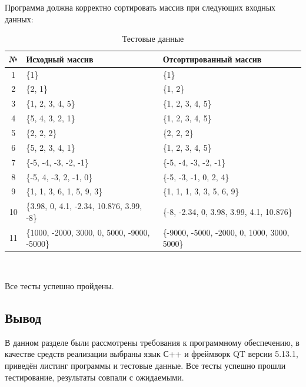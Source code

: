 \documentclass[a4paper,12pt]{article}
\begin{document}
    Программа должна корректно сортировать массив при следующих входных данных:
     \begin{table} [h!]
    \begin{center}
    \caption{Тестовые данные} 
    \begin{tabular}{|c|p{7cm}|p{7cm}|}
    \hline
№ & Исходный массив & Отсортированный массив \\
    	\hline
    	1 & \{1\} & \{1\}  \\
    	\hline
    	2 & \{2, 1\} & \{1, 2\}  \\
    	\hline
    	3 & \{1, 2, 3, 4, 5\} & \{1, 2, 3, 4, 5\} \\
    	\hline
    	4 & \{5, 4, 3, 2, 1\} & \{1, 2, 3, 4, 5\}   \\
    	\hline
    	5 & \{2, 2, 2\} & \{2, 2, 2\}   \\
    	\hline
    	6 & \{5, 2, 3, 4, 1\} & \{1, 2, 3, 4, 5\}   \\
    	\hline
    	7 & \{-5, -4, -3, -2, -1\} & \{-5, -4, -3, -2, -1\}  \\
    	\hline
    	8 & \{-5, 4, -3, 2, -1, 0\} & \{-5, -3, -1, 0, 2, 4\}   \\
    	\hline
    	9 & \{1, 1, 3, 6, 1, 5, 9, 3\} & \{1, 1, 1, 3, 3, 5, 6, 9\}  \\
    	\hline
    	10 & \{3.98, 0, 4.1, -2.34, 10.876, 3.99, -8\} & \{-8, -2.34, 0, 3.98, 3.99, 4.1, 10.876\}  \\
    	\hline
    	11 & \{1000, -2000, 3000, 0, 5000, -9000, -5000\} & \{-9000, -5000, -2000, 0, 1000, 3000, 5000\}  \\
    	\hline

    	
    \end{tabular} \\
	\label{table:test_data_table}
    \end{center}
    \end{table}
    \newpage    	
    Все тесты успешно пройдены.
		
		
	
	
	\subsection*{Вывод}
	
	В данном разделе были рассмотрены требования к программному обеспечению, в качестве средств реализации выбраны язык С++ и фреймворк QT версии 5.13.1, приведён листинг программы и тестовые данные. Все тесты успешно прошли тестирование, результаты совпали с ожидаемыми.
	
\end{document}
